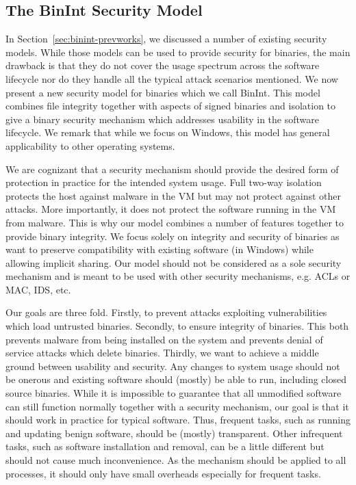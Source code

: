\subsection{The BinInt Security Model}
\label{sec:binint-model}

In Section~\ref{sec:binint-prevworks}, we discussed a number of existing
security models. While those models can be used to provide security
for binaries, the main drawback is that they do not cover the usage spectrum
across the software lifecycle nor do they handle all the
typical attack scenarios mentioned.
We now present a new security model for binaries
which we call BinInt.
This model combines file integrity together with
aspects of signed binaries and isolation to give a binary
security mechanism which 
addresses usability in the software lifecycle. We remark
that while we focus on Windows, this model has general applicability
to other operating systems.

We are cognizant that a security mechanism
should provide the desired form of protection in practice for
the intended system usage.
Full two-way isolation protects the host
against malware in the VM but may not
protect against other attacks.
More importantly, it does not protect the software running 
in the VM from malware.
This is why our model combines a number of features together to provide
binary integrity. 
We focus solely on integrity and security of binaries
as want to preserve compatibility with existing
software (in Windows) while allowing implicit sharing.
Our model should not be considered as a sole security mechanism and
is meant to be used with other security mechanisms, 
e.g. ACLs or MAC, IDS, etc.

Our goals are three fold.
Firstly, to prevent attacks exploiting vulnerabilities which load 
untrusted binaries.
Secondly, to ensure integrity of binaries.
This both prevents malware from being installed on the system and 
prevents denial of service attacks which delete binaries.
Thirdly, we want to achieve a middle ground
between usability and security.
Any changes to system usage should not be onerous and existing software 
should (mostly) be able to run, including closed source binaries.
While it is impossible to guarantee that all unmodified software can still
function normally together with a security mechanism, our goal is that
it should work in practice for typical software.
Thus, frequent tasks, such as running and updating benign software, 
should be (mostly) transparent.
Other infrequent tasks, such as software installation and removal, 
can be a little different but should not cause much inconvenience.
As the mechanism should be applied to all processes, 
it should only have small overheads especially for frequent tasks.

